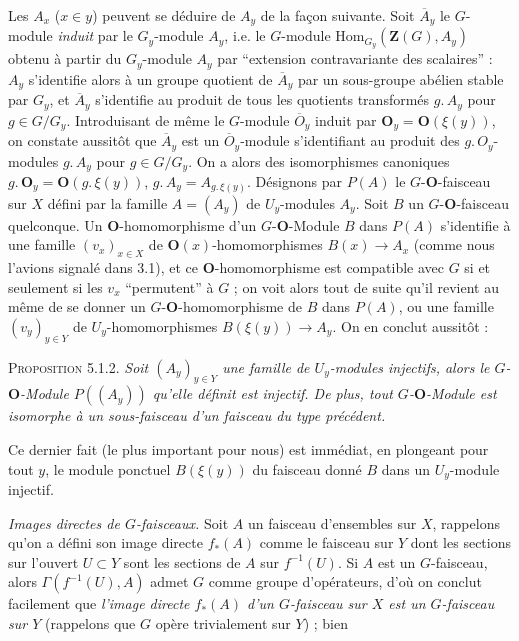 Les $A_x$ ($x\in y$) peuvent se déduire de $A_y$ de la façon suivante. Soit
$\overline A_y$ le $G$-module \textit{induit} par le $G_y$-module $A_y$, i.e.
le $G$-module $\mathrm{Hom}_{G_y}(\mathbf Z(G),A_y)$ obtenu à partir du
$G_y$-module $A_y$ par ``extension contravariante des scalaires'' : $A_y$
s'identifie alors à un groupe quotient de $\overline A_y$ par un sous-groupe
abélien stable par $G_y$, et $\overline A_y$ s'identifie au produit de tous
les quotients transformés $g.\,A_y$ pour $g\in G/G_y$.
Introduisant de même le $G$-module $\overline O_y$ induit par
${\mathbf O}_y={\mathbf O}(\xi(y))$, on constate aussitôt que $\overline A_y$ est un
$\overline O_y$-module s'identifiant au produit des
$g.\,O_y$-modules $g.\,A_y$ pour $g\in G/G_y$. On a
alors des isomorphismes canoniques $g.\,{\mathbf O}_y={\mathbf O}(g.\,\xi(y))$, $g.\,A_y=A_{g.\,\xi(y)}$.
Désignons par $P(A)$ le $G$-${\mathbf O}$-faisceau sur $X$ défini par la famille
$A=(A_y)$ de $U_y$-modules $A_y$.
Soit $B$ un $G$-${\mathbf O}$-faisceau quelconque. Un ${\mathbf O}$-homomorphisme d'un
$G$-${\mathbf O}$-Module $B$ dans $P(A)$ s'identifie à une famille $(v_x)_{x\in X}$ de
${\mathbf O}(x)$-homomorphismes $B(x)\to A_x$ (comme nous l'avions signalé
dans 3.1), et ce ${\mathbf O}$-homomorphisme est compatible avec $G$ si et seulement si
les $v_x$ ``permutent'' à $G$ ; on voit alors tout de suite qu'il revient au
même de se donner un $G$-${\mathbf O}$-homomorphisme de $B$ dans $P(A)$, ou une famille
$(v_y)_{y\in Y}$ de $U_y$-homomorphismes
$B(\xi(y))\to A_y$. On en conclut aussitôt :

\textsc{Proposition 5.1.2.} \textit{Soit $(A_y)_{y\in Y}$ une
famille de $U_y$-modules injectifs, alors le $G$-${\mathbf O}$-Module $P((A_y))$
qu'elle définit est injectif. De plus, tout $G$-${\mathbf O}$-Module est isomorphe à un
sous-faisceau d'un faisceau du type précédent.}

Ce dernier fait (le plus important pour nous) est immédiat, en plongeant pour
tout $y$, le module ponctuel $B(\xi(y))$ du faisceau donné $B$ dans un
$U_y$-module injectif.

\textit{Images directes de $G$-faisceaux.} Soit $A$ un faisceau
d'ensembles sur $X$, rappelons qu'on a défini son image directe $f_*(A)$ comme
le faisceau sur $Y$ dont les sections sur l'ouvert $U\subset Y$ sont les
sections de $A$ sur $f^{-1}(U)$. Si $A$ est un $G$-faisceau, alors
$\Gamma(f^{-1}(U),A)$ admet $G$ comme groupe d'opérateurs, d'où on conclut
facilement que \textit{l'image directe $f_*(A)$ d'un $G$-faisceau sur $X$ est
un $G$-faisceau sur $Y$} (rappelons que $G$ opère trivialement sur $Y$) ; bien

